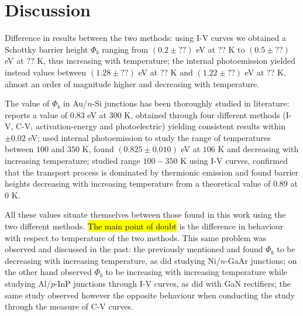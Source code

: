 \newpage %

\section{Discussion}
Difference in results between the two methods:
using I-V curves we obtained a Schottky barrier height $\Phi_b$ ranging from $(0.2\pm??)$ eV at ?? K to $(0.5 \pm ??)$ eV at ?? K, thus increasing with temperature; 
the internal photoemission yielded instead values between $(1.28 \pm ??)$ eV at ?? K and $(1.22 \pm ??)$ eV at ?? K, almost an order of magnitude higher and decreasing with temperature.

The value of $\Phi_b$ in Au/$n$-Si junctions has been thoroughly studied in literature: 
\cite{sze_physics_2007} reports a value of $0.83$ eV at 300 K, obtained through four different methods (I-V, C-V, activation-energy and photoelectric) yielding consistent results within $\pm 0.02$ eV; 
\cite{crowell_equality_1964} used internal photoemission to study the range of temperatures between $100$ and $350$ K, found $(0.825 \pm 0.010)$ eV at $106$ K and decreasing with increasing temperature; 
\cite{arizumi_transport_1969} studied range $100-350$ K using I-V curves, confirmed that the transport process is dominated by thermionic emission and found barrier heights decreasing with increasing temperature from a theoretical value of $0.89$ at $0$ K.

All these values situate themselves between those found in this work using the two different methods. \hl{The main point of doubt} is the difference in behaviour with respect to temperature of the two methods.
This same problem was observed and discussed in the past:
the previously mentioned \cite{crowell_equality_1964} and \cite{arizumi_transport_1969} found $\Phi_b$ to be decreasing with increasing temperature, as did \cite{hackam_electrical_1972} studying Ni/$n$-GaAr junctions;
\cite{yildirim_temperature-dependent_2010} on the other hand observed $\Phi_b$ to be increasing with increasing temperature while studying Al/$p$-InP junctions through I-V curves, as did \cite{zhou_temperature-dependent_2007} with GaN rectifiers; the same study observed however the opposite behaviour when conducting the study through the measure of C-V curves.

